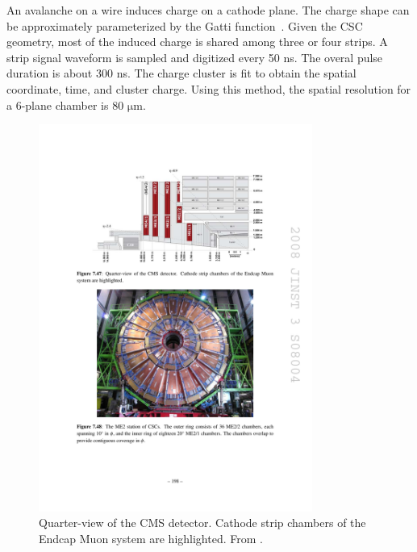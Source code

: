 An avalanche on a wire induces charge on a cathode plane.
The charge shape can be approximately parameterized by the Gatti function~\cite{GATTI197983}.
Given the CSC geometry, most of the induced charge is shared among three or four strips.
A strip signal waveform is sampled and digitized every 50 ns.
The overal pulse duration is about 300 ns.
The charge cluster is fit to obtain the spatial coordinate, time, and cluster charge.
Using this method, the spatial resolution for a 6-plane chamber is 80 $\mathrm{\mu m}$.

\begin{figure}[hbtp]
\centering
\includegraphics[width=0.8\textwidth]{figures/cms_quarter_csc_red.pdf}
\caption{
Quarter-view of the CMS detector. Cathode strip chambers of the Endcap Muon
system are highlighted.
From \cite{Chatrchyan:2008aa}.
}
\label{fig:cms_quarter_csc_red}
\end{figure}

